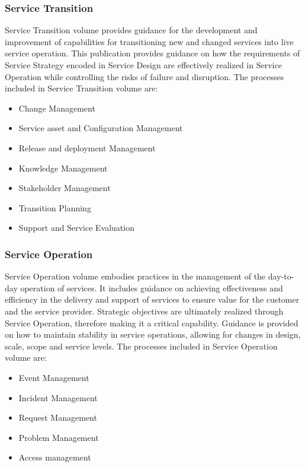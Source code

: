 \subsubsection{Service Transition} 

Service Transition volume provides guidance for the development and improvement of capabilities for transitioning new and changed services into live service operation. This publication provides guidance on how the requirements of Service Strategy encoded in Service Design are effectively realized in Service Operation while controlling the risks of failure and disruption.\cite{itilST} The processes included in Service Transition volume are:

\begin{itemize}
  \item Change Management
  \item Service asset and Configuration Management
  \item Release and deployment Management
  \item Knowledge Management
  \item Stakeholder Management
  \item Transition Planning 
  \item Support and Service Evaluation 
\end{itemize} 

\subsubsection{Service Operation} 

Service Operation volume embodies practices in the management of the day-to-day operation of services. It includes guidance on achieving effectiveness and efficiency in the delivery and support of services to ensure value for the customer and the service provider. Strategic objectives are ultimately realized through Service Operation, therefore making it a critical capability. Guidance is provided on how to maintain stability in service operations, allowing for changes in design, scale, scope and service levels.\cite{itilSO} The processes included in Service Operation volume are:

\begin{itemize}
  \item Event Management
  \item Incident Management
  \item Request Management
  \item Problem Management
  \item Access management
\end{itemize} 

